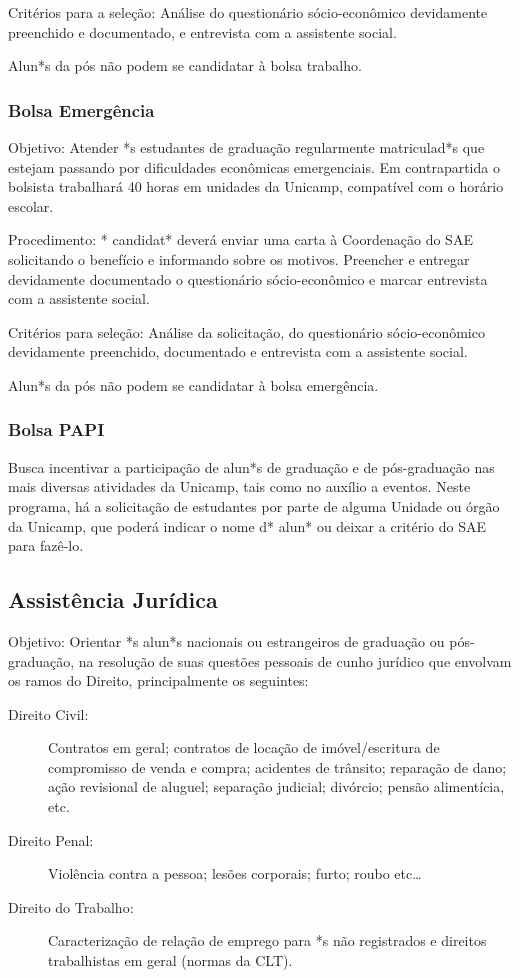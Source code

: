 Critérios para a seleção: Análise do questionário sócio-econômico devidamente
preenchido e documentado, e entrevista com a assistente social.

Alun*s da pós não podem se candidatar à bolsa trabalho.

\subsubsection{Bolsa Emergência}

Objetivo: Atender *s estudantes de graduação regularmente matriculad*s que
estejam passando por dificuldades econômicas emergenciais. Em contrapartida o
bolsista trabalhará 40 horas em unidades da Unicamp, compatível com o horário
escolar.

Procedimento: * candidat* deverá enviar uma carta à Coordenação do SAE
solicitando o benefício e informando sobre os motivos. Preencher e entregar
devidamente documentado o questionário sócio-econômico e marcar entrevista com
a assistente social.

Critérios para seleção: Análise da solicitação, do questionário sócio-econômico
devidamente preenchido, documentado e entrevista com a assistente social.

Alun*s da pós não podem se candidatar à bolsa emergência.

\subsubsection{Bolsa PAPI}

Busca incentivar a participação de alun*s de graduação e de pós-graduação nas
mais diversas atividades da Unicamp, tais como no auxílio a eventos. Neste
programa, há a solicitação de estudantes por parte de alguma Unidade ou órgão
da Unicamp, que poderá indicar o nome d* alun* ou deixar a critério do SAE para
fazê-lo.

\subsection{Assistência Jurídica}

Objetivo: Orientar *s alun*s nacionais ou estrangeiros de graduação ou
pós-graduação, na resolução de suas questões pessoais de cunho jurídico que
envolvam os ramos do Direito, principalmente os seguintes:

\begin{description}
    \item[Direito Civil:] Contratos em geral; contratos de locação de
        imóvel/escritura de compromisso de venda e compra; acidentes de
        trânsito; reparação de dano; ação revisional de aluguel; separação
        judicial; divórcio; pensão alimentícia, etc.

    \item[Direito Penal:] Violência contra a pessoa; lesões corporais; furto;
        roubo etc{\dots}

    \item[Direito do Trabalho:] Caracterização de relação de emprego para *s
    não registrados e direitos trabalhistas em geral (normas da CLT).
\end{description}

